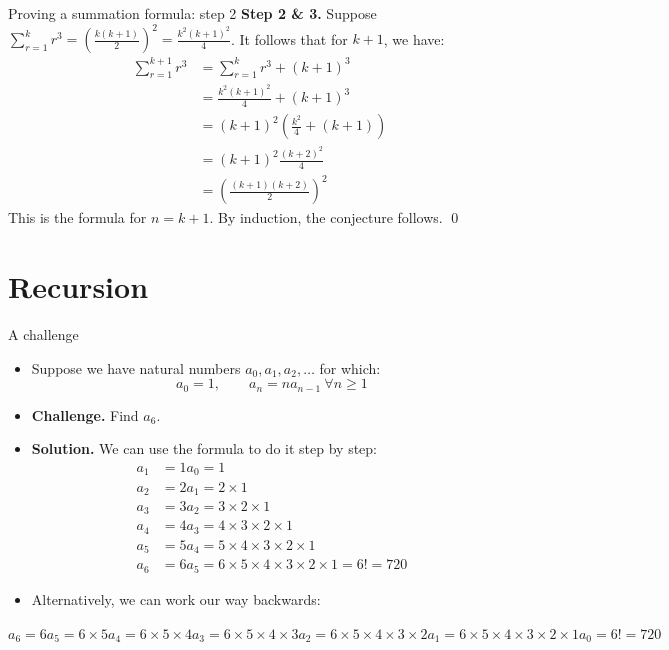 \documentclass[11pt,aspectratio=1610,handout]{beamer}
\begin{document}
		\begin{frame}{Proving a summation formula: step 2}
			\textbf{Step 2 \& 3.} Suppose $\displaystyle \sum_{r=1}^k r^3 = \left( \frac{k(k+1)}{2}\right)^2 = \frac{k^2(k+1)^2}{4}$. \p It follows that for $k+1$, we have: 
			\begin{align*}
			\sum_{r=1}^{k+1} r^3 &= \sum_{r=1}^k r^3 + (k+1)^3 \\
			&= \frac{k^2(k+1)^2}{4} + (k+1)^3 \\
			&= (k+1)^2 \left( \frac{k^2}{4} + (k+1)\right) \\
			&= (k+1)^2\frac{(k+2)^2}{4} \\
			&= \left( \frac{(k+1)(k+2)}{2}\right)^2
			\end{align*}
			This is the formula for $n=k+1$. By induction, the conjecture follows. \qed
		\end{frame}


\section{Recursion}
		
\begin{frame}{A challenge}
	\begin{itemize}
		\item Suppose we have natural numbers $a_0, a_1, a_2, \ldots$ for which:
		\[
		a_0 = 1, \qquad a_n = na_{n-1} \: \forall n \geq 1
		\] \p
		
		\item \textbf{Challenge.} Find $a_6$. \p 
		\item \textbf{Solution.} We can use the formula to do it step by step: \vspace{-1mm}
		\begin{align*}
		a_1 &= 1a_0 = 1 \\
		a_2 &= 2a_1 = 2 \times 1 \\
		a_3 &= 3a_2 = 3\times2\times 1 \\
		a_4 &= 4a_3 = 4\times3\times2\times1 \\
		a_5 &= 5a_4 = 5\times4\times3\times2\times1 \\
		a_6 &= 6a_5 = 6\times 5 \times 4\times3\times2\times1 = \boxed{6! = 720}
		\end{align*}\p 
		\item Alternatively, we can work our way backwards: \p 
	\end{itemize}
	{\small $a_6 = 6a_5 = 6\times 5a_4 = 6\times5\times4a_3 = 6\times5\times4\times3a_2 
	= 6\times5\times4\times3\times2a_1 = 6\times5\times4\times3\times2\times1a_0 = \boxed{6! = 720}$}
\end{frame}
\end{document}
